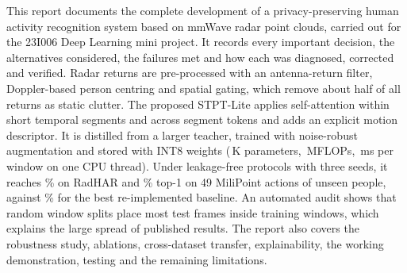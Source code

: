 This report documents the complete development of a privacy-preserving human
activity recognition system based on mmWave radar point clouds, carried out for
the 23I006 Deep Learning mini project. It records every important decision, the
alternatives considered, the failures met and how each was diagnosed, corrected
and verified. Radar returns are pre-processed with an antenna-return filter,
Doppler-based person centring and spatial gating, which remove about half of all
returns as static clutter. The proposed STPT-Lite applies self-attention within
short temporal segments and across segment tokens and adds an explicit motion
descriptor. It is distilled from a larger teacher, trained with noise-robust augmentation and stored with INT8 weights
(\oursParamsK\,K parameters, \oursMflops\,MFLOPs, \oursLat\,ms per window on one
CPU thread). Under leakage-free protocols with three seeds, it reaches
\rastptlitekdrobustAcc\% on RadHAR and \mistptlitekdrobustAcc\% top-1 on 49 MiliPoint
actions of unseen people, against \mipointnetAcc\% for the best re-implemented baseline. An automated
audit shows that random window splits place most test frames inside training
windows, which explains the large spread of published results. The report also
covers the robustness study, ablations, cross-dataset transfer, explainability,
the working demonstration, testing and the remaining limitations.
